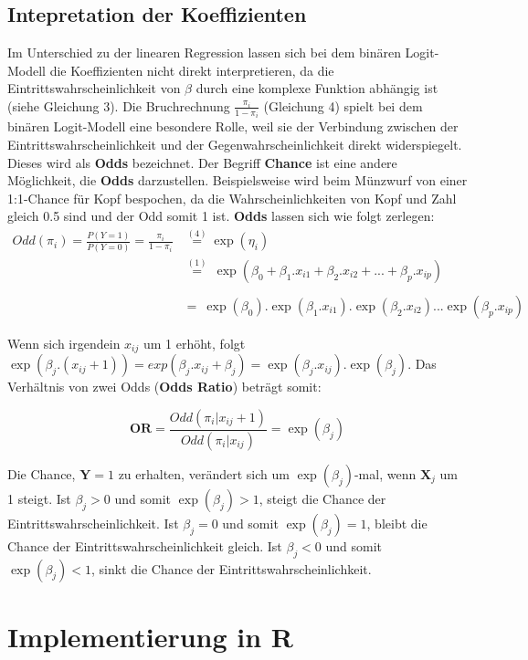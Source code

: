 \documentclass[12pt,]{article}
\begin{document}
\subsection{Intepretation der
Koeffizienten}\label{intepretation-der-koeffizienten}

Im Unterschied zu der linearen Regression lassen sich bei dem binären
Logit-Modell die Koeffizienten nicht direkt interpretieren, da die
Eintrittswahrscheinlichkeit von \(\beta\) durch eine komplexe Funktion
abhängig ist (siehe Gleichung 3). Die Bruchrechnung
\(\frac{\pi_i}{1-\pi_i}\) (Gleichung 4) spielt bei dem binären
Logit-Modell eine besondere Rolle, weil sie der Verbindung zwischen der
Eintrittswahrscheinlichkeit und der Gegenwahrscheinlichkeit direkt
widerspiegelt. Dieses wird als \textbf{Odds} bezeichnet. Der Begriff
\textbf{Chance} ist eine andere Möglichkeit, die \textbf{Odds}
darzustellen. Beispielsweise wird beim Münzwurf von einer 1:1-Chance für
Kopf bespochen, da die Wahrscheinlichkeiten von Kopf und Zahl gleich 0.5
sind und der Odd somit 1 ist. \textbf{Odds} lassen sich wie folgt
zerlegen: \[
\begin{aligned}
Odd(\pi_i) = \frac{P(Y = 1)}{P(Y=0)} = \frac{\pi_i}{1-\pi_i} &\mathrel{\overset{(4)}{=}} \exp(\eta_i) \\ &\mathrel{\overset{(1)}{=}} \  \exp(\beta_0 + \beta_1.x_{i1} + \beta_2.x_{i2} + ... + \beta_p.x_{ip}) \\ \\
&= \ \exp(\beta_0).\exp(\beta_1.x_{i1}).\exp(\beta_2.x_{i2}) ... \exp(\beta_p.x_{ip})
\end{aligned}
\]

Wenn sich irgendein \(x_{ij}\) um 1 erhöht, folgt
\(\exp(\beta_j.(x_{ij}+1)) = exp(\beta_j.x_{ij}+\beta_j) = \exp(\beta_j.x_{ij}).\exp(\beta_j)\).
Das Verhältnis von zwei Odds (\textbf{Odds Ratio}) beträgt somit:

\[
\mathbf{OR} = \frac{Odd(\pi_i|x_{ij}+1)}{Odd(\pi_i|x_{ij})} = \exp(\beta_j)
\]

Die Chance, \(\mathbf{Y} = 1\) zu erhalten, verändert sich um
\(\exp(\beta_j)\)-mal, wenn \(\mathbf{X}_j\) um 1 steigt. Ist
\(\beta_j > 0\) und somit \(\exp(\beta_j) > 1\), steigt die Chance der
Eintrittswahrscheinlichkeit. Ist \(\beta_j = 0\) und somit
\(\exp(\beta_j) = 1\), bleibt die Chance der Eintrittswahrscheinlichkeit
gleich. Ist \(\beta_j < 0\) und somit \(\exp(\beta_j) < 1\), sinkt die
Chance der Eintrittswahrscheinlichkeit.

\section{Implementierung in R}\label{implementierung-in-r}
\end{document}
